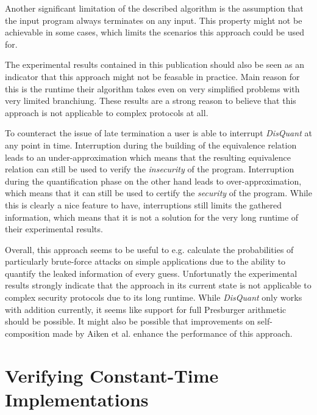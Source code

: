 \documentclass[a4paper,UKenglish]{lipics-v2018}
\begin{document}
Another significant limitation of the described algorithm is the assumption that the input program always terminates on any input. This property might not be achievable in some cases, which limits the scenarios this approach could be used for.

The experimental results contained in this publication should also be seen as an indicator that this approach might not be feasable in practice. Main reason for this is the runtime their algorithm takes even on very simplified problems with very limited branchiung. These results are a strong reason to believe that this approach is not applicable to complex protocols at all.
\cite{automatic_discovery_and_quantification}

To counteract the issue of late termination a user is able to interrupt \textit{DisQuant} at any point in time. Interruption during the building of the equivalence relation leads to an under-approximation which means that the resulting equivalence relation can still be used to verify the \textit{insecurity} of the program. Interruption during the quantification phase on the other hand leads to over-approximation, which means that it can still be used to certify the \textit{security} of the program. While this is clearly a nice feature to have, interruptions still limits the gathered information, which means that it is not a solution for the very long runtime of their experimental results.
\cite{automatic_discovery_and_quantification}

Overall, this approach seems to be useful to e.g. calculate the probabilities of particularly brute-force attacks on simple applications due to the ability to quantify the leaked information of every guess. Unfortunatly the experimental results strongly indicate that the approach in its current state is not applicable to complex security protocols due to its long runtime. While \textit{DisQuant} only works with addition currently, it seems like support for full Presburger  arithmetic should be possible. It might also be possible that improvements on self-composition made by Aiken et al. enhance the performance of this approach.\cite{secure_information_flow_safety}



\section{Verifying Constant-Time Implementations}
\end{document}
